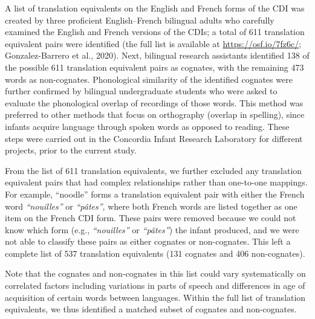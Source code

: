 \documentclass[
  english,
  ,man,floatsintext]{apa6}
\begin{document}
A list of translation equivalents on the English and French forms of the CDI was created by three proficient English--French bilingual adults who carefully examined the English and French versions of the CDIs; a total of 611 translation equivalent pairs were identified (the full list is available at \url{https://osf.io/7fz6c/}; Gonzalez-Barrero et al., 2020). Next, bilingual research assistants identified 138 of the possible 611 translation equivalent pairs as cognates, with the remaining 473 words as non-cognates. Phonological similarity of the identified cognates were further confirmed by bilingual undergraduate students who were asked to evaluate the phonological overlap of recordings of those words. This method was preferred to other methods that focus on orthography (overlap in spelling), since infants acquire language through spoken words as opposed to reading. These steps were carried out in the Concordia Infant Research Laboratory for different projects, prior to the current study.

From the list of 611 translation equivalents, we further excluded any translation equivalent pairs that had complex relationships rather than one-to-one mappings. For example, ``noodle'' forms a translation equivalent pair with either the French word \emph{``nouilles''} or \emph{``pâtes''}, where both French words are listed together as one item on the French CDI form. These pairs were removed because we could not know which form (e.g., \emph{``nouilles''} or \emph{``pâtes''}) the infant produced, and we were not able to classify these pairs as either cognates or non-cognates. This left a complete list of 537 translation equivalents (131 cognates and 406 non-cognates).

Note that the cognates and non-cognates in this list could vary systematically on correlated factors including variations in parts of speech and differences in age of acquisition of certain words between languages. Within the full list of translation equivalents, we thus identified a matched subset of cognates and non-cognates.
\end{document}
